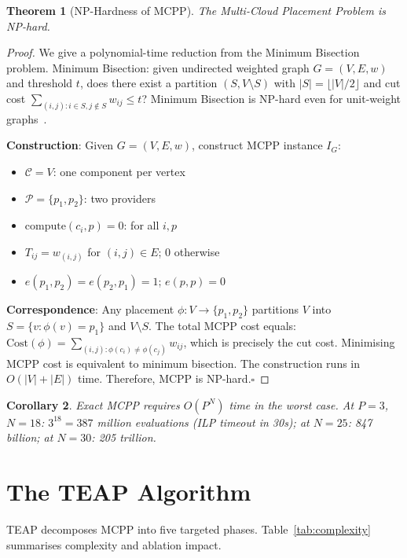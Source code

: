 \documentclass[10pt,journal]{IEEEtran}
\newtheorem{theorem}{Theorem}
\newtheorem{corollary}[theorem]{Corollary}
\begin{document}
\begin{theorem}[NP-Hardness of MCPP]\label{thm:nph}
The Multi-Cloud Placement Problem is NP-hard.
\end{theorem}
\begin{proof}
We give a polynomial-time reduction from the Minimum Bisection problem.
Minimum Bisection: given undirected weighted graph $G=(V,E,w)$ and threshold $t$,
does there exist a partition $(S, V\setminus S)$ with $|S| = \lfloor|V|/2\rfloor$
and cut cost $\sum_{(i,j): i\in S, j\notin S} w_{ij} \leq t$?
Minimum Bisection is NP-hard even for unit-weight graphs~\cite{garey1979}.

\textbf{Construction}: Given $G=(V,E,w)$, construct MCPP instance $I_G$:
\begin{itemize}[leftmargin=*,noitemsep]
  \item $\mathcal{C} = V$: one component per vertex
  \item $\mathcal{P} = \{p_1, p_2\}$: two providers
  \item $\text{compute}(c_i, p) = 0$: for all $i, p$
  \item $T_{ij} = w_{(i,j)}$ for $(i,j) \in E$; 0 otherwise
  \item $e(p_1, p_2) = e(p_2, p_1) = 1$; $e(p,p) = 0$
\end{itemize}

\textbf{Correspondence}: Any placement $\phi: V \to \{p_1,p_2\}$ partitions $V$ into
$S = \{v : \phi(v) = p_1\}$ and $V\setminus S$.
The total MCPP cost equals:
$\text{Cost}(\phi) = \sum_{(i,j): \phi(c_i)\neq\phi(c_j)} w_{ij}$,
which is precisely the cut cost.
Minimising MCPP cost is equivalent to minimum bisection.
The construction runs in $O(|V|+|E|)$ time.
Therefore, MCPP is NP-hard.\hfill$\square$
\end{proof}

\begin{corollary}\label{cor:space}
Exact MCPP requires $O(P^N)$ time in the worst case.
At $P=3$, $N=18$: $3^{18} = 387$ million evaluations (ILP timeout in 30s);
at $N=25$: 847 billion; at $N=30$: 205 trillion.
\end{corollary}

\section{The TEAP Algorithm}\label{sec:teap}

TEAP decomposes MCPP into five targeted phases.
Table~\ref{tab:complexity} summarises complexity and ablation impact.
\end{document}
